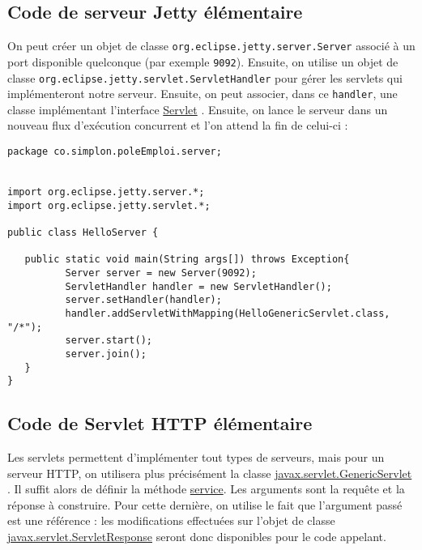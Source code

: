\documentclass[11pt]{article}
\begin{document}
\subsection{Code de serveur Jetty élémentaire}
\label{sec:org1911ed8}

On peut créer un objet de classe \texttt{org.eclipse.jetty.server.Server} associé à un
port disponible quelconque (par exemple \texttt{9092}). Ensuite, on utilise un objet de
classe \texttt{org.eclipse.jetty.servlet.ServletHandler} pour gérer les servlets qui
implémenteront notre serveur. Ensuite, on peut associer, dans ce \texttt{handler}, une
classe implémentant l'interface
\href{https://docs.oracle.com/javaee/7/api/javax/servlet/Servlet.html}{Servlet} .
Ensuite, on lance le serveur dans un nouveau flux d'exécution concurrent et l'on
attend la fin de celui-ci :
\begin{verbatim}
package co.simplon.poleEmploi.server;


import org.eclipse.jetty.server.*;
import org.eclipse.jetty.servlet.*;

public class HelloServer {

   public static void main(String args[]) throws Exception{
          Server server = new Server(9092);
          ServletHandler handler = new ServletHandler();
          server.setHandler(handler);
          handler.addServletWithMapping(HelloGenericServlet.class, "/*");
          server.start();
          server.join();
   }
}
\end{verbatim}
\subsection{Code de Servlet HTTP élémentaire}
\label{sec:org87775d8}
Les servlets permettent d'implémenter tout types de serveurs, mais pour un
serveur HTTP, on utilisera plus précisément la classe
\href{https://docs.oracle.com/javaee/7/api/javax/servlet/GenericServlet.html}{javax.servlet.GenericServlet} . Il suffit alors de définir la méthode \href{https://docs.oracle.com/javaee/7/api/javax/servlet/GenericServlet.html#service-javax.servlet.ServletRequest-javax.servlet.ServletResponse-}{service}.
Les arguments sont la requête et la réponse à construire. Pour cette dernière,
on utilise le fait que l'argument passé est une référence : les modifications
effectuées sur l'objet de classe \href{https://docs.oracle.com/javaee/7/api/javax/servlet/ServletResponse.html}{javax.servlet.ServletResponse} seront
donc disponibles pour le code appelant.
\end{document}
